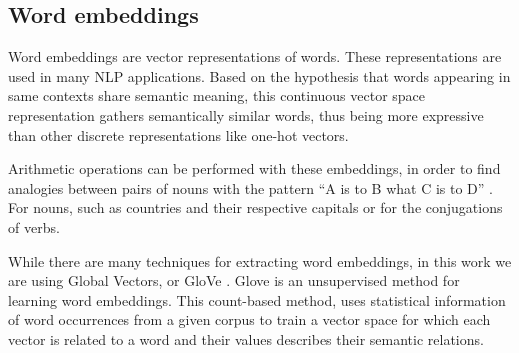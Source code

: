 \documentclass[11pt,a4paper]{article}
\begin{document}

















\subsection{Word embeddings}
\label{sec:we}

Word embeddings are vector representations of words. 
These representations are used in many NLP applications.
Based on the hypothesis that words appearing in same contexts share semantic meaning, this continuous vector space representation gathers semantically similar words, thus being more expressive than other discrete representations like one-hot vectors.

Arithmetic operations can be performed with these embeddings, in order to find analogies between pairs of nouns with the pattern ``A is to B what C is to D'' \cite{mikolov2013a}. For nouns, such as countries and their respective capitals or for the conjugations of verbs.

While there are many techniques for extracting word embeddings, in this work we are using Global Vectors, or GloVe \cite{pennington2014}. Glove is an unsupervised method for learning word embeddings. This count-based method, uses statistical information of word occurrences from a given corpus to train a vector space for which each vector is related to a word and their values describes their semantic relations.
\end{document}
